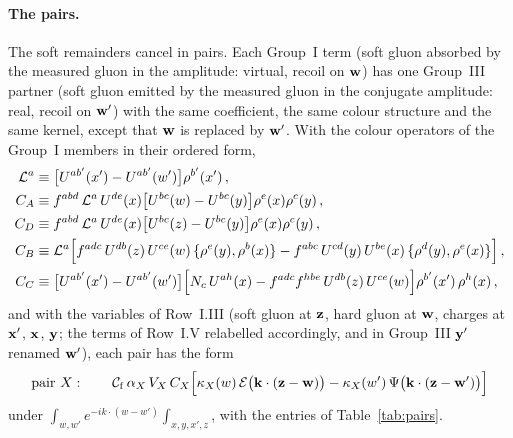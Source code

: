 \paragraph{The pairs.} The soft remainders cancel in pairs. Each Group~I term (soft gluon absorbed by the measured gluon in the amplitude: virtual, recoil on $\mathbf{w}$) has one Group~III partner (soft gluon emitted by the measured gluon in the conjugate amplitude: real, recoil on $\mathbf{w}'$) with the same coefficient, the same colour structure and the same kernel, except that $\mathbf{w}$ is replaced by $\mathbf{w}'$. With the colour operators of the Group~I members in their ordered form,
\begin{align}\label{eq:CABCD}
\mathcal L^a&\equiv\big[U^{ab'}(x')-U^{ab'}(w')\big]\rho^{b'}(x')\,,\notag\\
C_A&\equiv f^{abd}\,\mathcal L^a\,U^{de}(x)\big[U^{bc}(w)-U^{bc}(y)\big]\rho^e(x)\rho^c(y)\,,\notag\\
C_D&\equiv f^{abd}\,\mathcal L^a\,U^{de}(x)\big[U^{bc}(z)-U^{bc}(y)\big]\rho^e(x)\rho^c(y)\,,\notag\\
C_B&\equiv\mathcal L^a\Big[f^{adc}\,U^{db}(z)\,U^{ce}(w)\,\{\rho^e(y),\rho^b(x)\}-f^{abc}\,U^{cd}(y)\,U^{be}(x)\,\{\rho^d(y),\rho^e(x)\}\Big]\,,\notag\\
C_C&\equiv\big[U^{ab'}(x')-U^{ab'}(w')\big]\Big[N_c\,U^{ah}(x)-f^{adc}f^{hbe}\,U^{db}(z)\,U^{ce}(w)\Big]\rho^{b'}(x')\,\rho^h(x)\,,
\end{align}
and with the variables of Row~I.III (soft gluon at $\mathbf{z}$, hard gluon at $\mathbf{w}$, charges at $\mathbf{x}'$, $\mathbf{x}$, $\mathbf{y}$; the terms of Row~I.V relabelled accordingly, and in Group~III $\mathbf{y}'$ renamed $\mathbf{w}'$), each pair has the form
\begin{align}\label{eq:pair}
\text{pair }X:\qquad\mathcal C_{\rm f}\,\alpha_X\,V_X\,C_X\Big[\kappa_X(w)\,\mathcal E\big(\mathbf{k}\cdot(\mathbf{z}-\mathbf{w})\big)-\kappa_X(w')\,\Psi\big(\mathbf{k}\cdot(\mathbf{z}-\mathbf{w}')\big)\Big]
\end{align}
under $\int_{w,w'}e^{-ik\cdot(w-w')}\int_{x,y,x',z}$, with the entries of Table~\ref{tab:pairs}.
